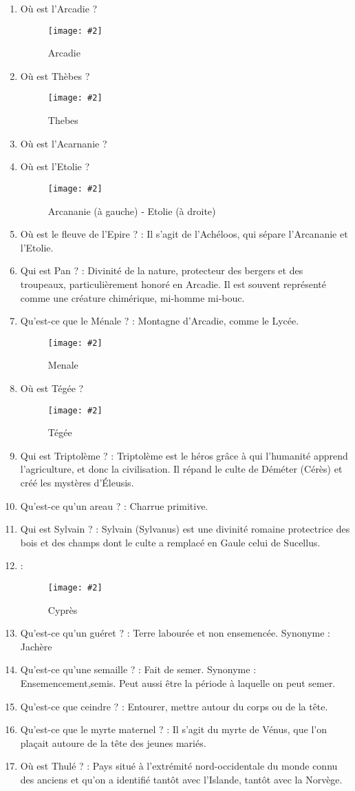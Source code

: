 \documentclass[a4paper, 11pt, hidelinks]{article}
\newcommand{\img}[4]{\begin{figure}[!ht]
    \centering
    \texttt{[image: \#2]}
    \caption{#3}
    \label{#4}
    \end{figure} }
\begin{document}
\begin{enumerate}
            \img{0.5}{mont Lycee.png}{Mont Lycée}{4}
      \item Où est l'Arcadie ? \img{0.5}{Arcadie.png}{Arcadie}{5}
            \newpage
      \item Où est Thèbes ? \img{0.5}{Thebes.png}{Thebes}{6}
      \item Où est l'Acarnanie ?
      \item Où est l'Etolie ? \img{0.5}{Arcananie Etolie.png}{Arcananie (à gauche) - Etolie (à droite)}{7}
      \item Où est le fleuve de l'Epire ? : Il s'agit de l'Achéloos, qui sépare l'Arcananie et l'Etolie.
      \item Qui est Pan ? : Divinité de la nature, protecteur des bergers et des troupeaux, particulièrement honoré en Arcadie.
            Il est souvent représenté comme une créature chimérique, mi-homme mi-bouc.
      \item Qu'est-ce que le Ménale ? : Montagne d'Arcadie, comme le Lycée.
            \img{0.5}{Menale.png}{Menale}{8}
      \item Où est Tégée ? \img{0.5}{Tegee.png}{Tégée}{9}
      \item Qui est Triptolème ? : Triptolème est le héros grâce à qui l'humanité apprend l'agriculture, et donc la civilisation.
            Il répand le culte de Déméter (Cérès) et créé les mystères d'Éleusis.
      \item Qu'est-ce qu'un areau ? : Charrue primitive.
      \item Qui est Sylvain ? : Sylvain (Sylvanus) est une divinité romaine protectrice des bois et des champs dont le culte a remplacé en Gaule celui de Sucellus.
      \item   : \img{0.5}{Cypres.jpg}{Cyprès}{10}
            \newpage
      \item Qu'est-ce qu'un guéret ? : Terre labourée et non ensemencée. Synonyme : Jachère
      \item Qu'est-ce qu'une semaille ? : Fait de semer. Synonyme : Ensemencement,semis. Peut aussi être la période à laquelle on peut semer.
      \item Qu'est-ce que ceindre ? : Entourer, mettre autour du corps ou de la tête.
      \item Qu'est-ce que le myrte maternel ? : Il s'agit du myrte de Vénus, que l'on plaçait autoure de la tête des jeunes mariés.
      \item Où est Thulé ? : Pays situé à l'extrémité nord-occidentale du monde connu des anciens et qu'on a identifié tantôt avec l'Islande, tantôt avec la Norvège.

\end{enumerate}
\end{document}
